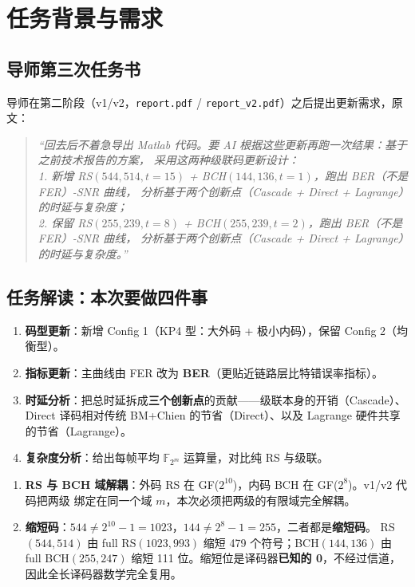 \documentclass[11pt,a4paper]{article}
\begin{document}
\section{任务背景与需求}

\subsection{导师第三次任务书}

导师在第二阶段（v1/v2，\texttt{report.pdf} / \texttt{report\_v2.pdf}）之后提出更新需求，原文：

\begin{quote}\itshape
``回去后不着急导出 Matlab 代码。要 AI 根据这些更新再跑一次结果：基于之前技术报告的方案，
采用这两种级联码更新设计：\\
1. 新增 RS$(544,514,t{=}15)$ + BCH$(144,136,t{=}1)$，跑出 BER（不是 FER）-SNR 曲线，
分析基于两个创新点（Cascade + Direct + Lagrange）的时延与复杂度；\\
2. 保留 RS$(255,239,t{=}8)$ + BCH$(255,239,t{=}2)$，跑出 BER（不是 FER）-SNR 曲线，
分析基于两个创新点（Cascade + Direct + Lagrange）的时延与复杂度。''
\end{quote}

\subsection{任务解读：本次要做四件事}

\begin{enumerate}[leftmargin=1.6em, itemsep=2pt]
\item \textbf{码型更新}：新增 Config 1（KP4 型：大外码 + 极小内码），保留 Config 2（均衡型）。
\item \textbf{指标更新}：主曲线由 FER 改为 \textbf{BER}（更贴近链路层比特错误率指标）。
\item \textbf{时延分析}：把总时延拆成\textbf{三个创新点}的贡献——级联本身的开销（Cascade）、
      Direct 译码相对传统 BM+Chien 的节省（Direct）、以及 Lagrange 硬件共享的节省（Lagrange）。
\item \textbf{复杂度分析}：给出每帧平均 $\mathbb{F}_{2^m}$ 运算量，对比纯 RS 与级联。
\end{enumerate}

\begin{keybox}[title=\textbf{Config 1 的两个技术挑战（相对 v1/v2 的新工作）}]
\begin{enumerate}[leftmargin=1.5em, itemsep=1pt]
\item \textbf{RS 与 BCH 域解耦}：外码 RS 在 GF($2^{10}$)，内码 BCH 在 GF($2^{8}$)。v1/v2 代码把两级
      绑定在同一个域 $m$，本次必须把两级的有限域完全解耦。
\item \textbf{缩短码}：$544\neq 2^{10}{-}1=1023$，$144\neq 2^{8}{-}1=255$，二者都是\textbf{缩短码}。
      RS$(544,514)$ 由 full RS$(1023,993)$ 缩短 479 个符号；BCH$(144,136)$ 由 full BCH$(255,247)$
      缩短 111 位。缩短位是译码器\textbf{已知的 0}，不经过信道，因此全长译码器数学完全复用。
\end{enumerate}
\end{keybox}
\end{document}
